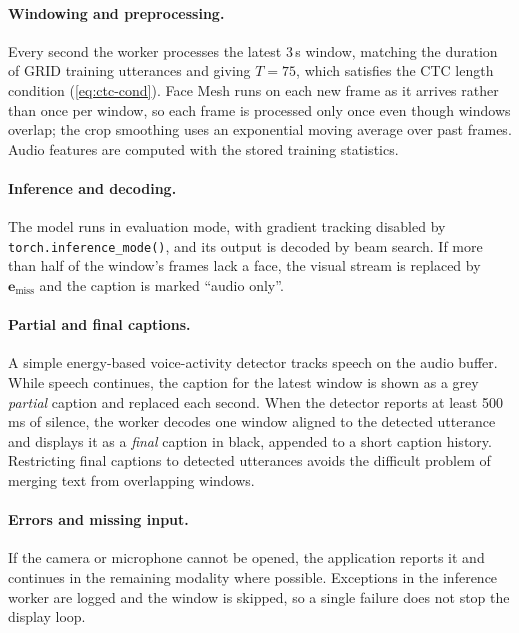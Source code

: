 \paragraph{Windowing and preprocessing.} Every second the worker processes the
latest 3\,s window, matching the duration of GRID training utterances and giving
$T=75$, which satisfies the CTC length condition (\cref{eq:ctc-cond}). Face Mesh
runs on each new frame as it arrives rather than once per window, so each frame is
processed only once even though windows overlap; the crop smoothing uses an
exponential moving average over past frames. Audio features are computed with
the stored training statistics.

\paragraph{Inference and decoding.} The model runs in evaluation mode, with
gradient tracking disabled by \texttt{torch.inference\_mode()}, and its output
is decoded by beam search. If more than half of
the window's frames lack a face, the visual stream is replaced by
$\mathbf{e}_{\text{miss}}$ and the caption is marked ``audio only''.

\paragraph{Partial and final captions.} A simple energy-based voice-activity
detector tracks speech on the audio buffer. While speech continues, the caption
for the latest window is shown as a grey \emph{partial} caption and replaced each
second. When the detector reports at least 500\,ms of silence, the worker decodes
one window aligned to the detected utterance and displays it as a \emph{final}
caption in black, appended to a short caption history. Restricting final
captions to detected utterances avoids the difficult problem of merging text
from overlapping windows.

\paragraph{Errors and missing input.} If the camera or microphone cannot be
opened, the application reports it and continues in the remaining modality
where possible. Exceptions in the inference worker are logged and the window is
skipped, so a single failure does not stop the display loop.


